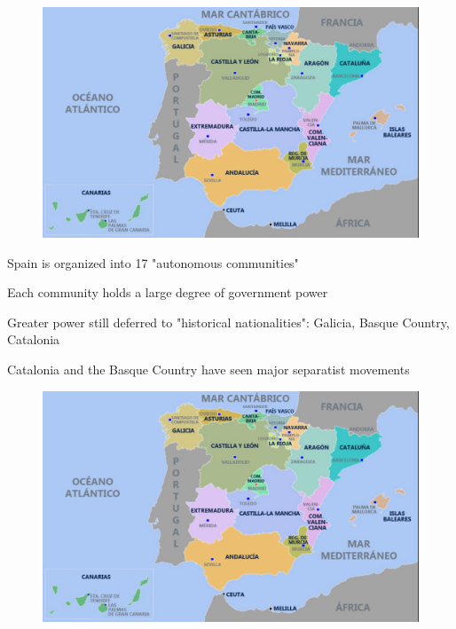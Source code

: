 \documentclass[notes,11pt, aspectratio=169]{beamer}
\newenvironment{wideitemize}{\itemize\addtolength{\itemsep}{10pt}}{\enditemize}
\begin{document}

\begin{frame}{}
    \begin{figure}
    \centering
        \includegraphics[width = .7\linewidth]{figures/mapa.png}
        \label{fig:map}
    \end{figure}
\end{frame}

\begin{frame}{}
    \begin{wideitemize}
        \item Spain is organized into 17 "autonomous communities" 
        \item Each community holds a large degree of government power \medskip 
        \begin{wideitemize}
            \item Greater power still deferred to "historical nationalities": Galicia, Basque Country, Catalonia
        \end{wideitemize}
        \item Catalonia and the Basque Country have seen major separatist movements 
    \end{wideitemize}
\end{frame}

\begin{frame}{}
    \begin{figure}
    \centering
        \includegraphics[width = .7\linewidth]{figures/mapa.png}
        \label{fig:map}
    \end{figure}
\end{frame}
\end{document}
